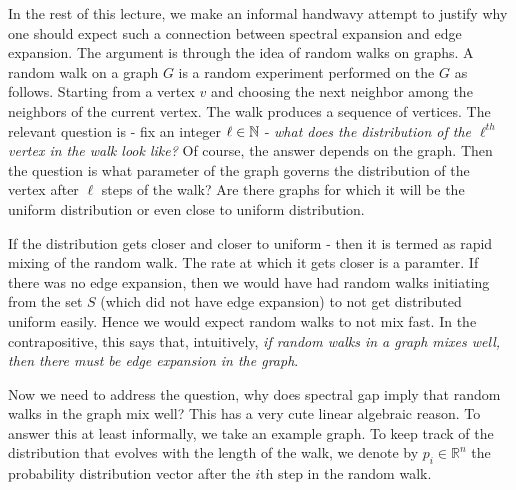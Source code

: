 In the rest of this lecture, we make an informal handwavy attempt to justify why one should expect such a connection between spectral expansion and edge expansion. The argument is through the idea of random walks on graphs. A random walk on a graph $G$ is a random experiment performed on the $G$ as follows. Starting from a vertex $v$ and choosing the next neighbor among the neighbors of the current vertex. The walk produces a sequence of vertices. The relevant question is - fix an integer $\ell \in \mathbb{N}$ - {\em what does the distribution of the $\ell^{th}$ vertex in the walk look like?} Of course, the answer depends on the graph. Then the question is what parameter of the graph governs the distribution of the vertex after $\ell$ steps of the walk? Are there graphs for which it will be the uniform distribution or even close to uniform distribution.

If the distribution gets closer and closer to uniform - then it is termed as {rapid mixing of the random walk}. The rate at which it gets closer is a paramter. If there was no edge expansion, then we would have had random walks initiating from the set $S$ (which did not have edge expansion) to not get distributed uniform easily. Hence we would expect random walks to not mix fast. In the contrapositive, this says that, intuitively, \textit{if random walks in a graph mixes well, then there must be edge expansion in the graph}.

Now we need to address the question, why does spectral gap imply that random walks in the graph mix well? This has a very cute linear algebraic reason. To answer this at least informally, we take an example graph. To keep track of the distribution that evolves with the length of the walk, we denote by $p_i \in \mathbb{R}^n$ the probability distribution vector after the $i$th step in the random walk.


